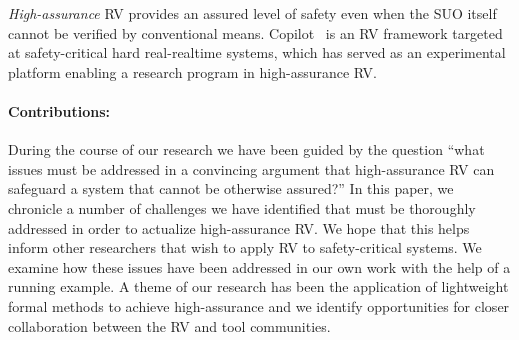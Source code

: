 \emph{High-assurance} RV provides an assured level of safety even when
the SUO itself cannot be verified  by conventional
means. Copilot~\cite{copilot, pike-isse-13} is an RV framework
targeted at safety-critical hard real-realtime systems, which has
served as an experimental  platform enabling  a
research   program in  high-assurance RV.  


\paragraph{Contributions:} During the course of our research we have
been guided by the question ``what
 issues must be  addressed in a convincing argument  that  high-assurance RV can safeguard a
system that cannot be otherwise assured?''  In this paper, we
chronicle a number of  challenges we have identified that must be
thoroughly addressed in order to actualize high-assurance RV.  We hope
that this helps inform other researchers that wish to apply RV to
safety-critical systems. We examine  how  these issues have been
addressed in our own work   with the help of a running example. A
theme of our research has been the 
application of lightweight formal methods to achieve
high-assurance and  we identify opportunities for closer collaboration
between the RV and tool communities.   



